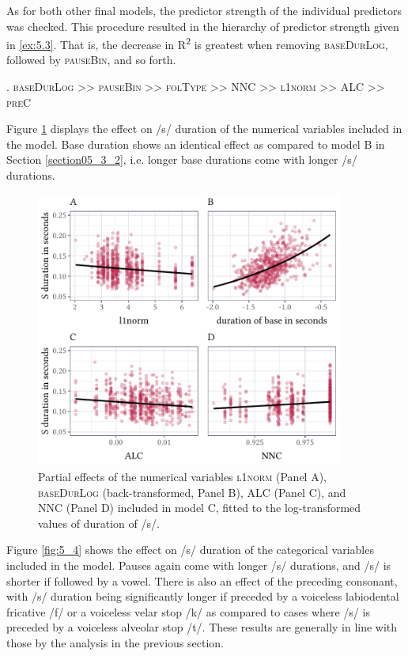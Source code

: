 As for both other final models, the predictor strength of the individual predictors was checked. This procedure resulted in the hierarchy of predictor strength given in \ref{ex:5.3}. That is, the decrease in R\textsuperscript{2} is greatest when removing \textsc{baseDurLog}, followed by \textsc{pauseBin}, and so forth. 

\ex.
\label{ex:5.3}
\textsc{baseDurLog >> pauseBin >> folType >> NNC >> l1norm >> ALC >> preC}

Figure \ref{fig:5_3} displays the effect on /s/ duration of the numerical variables included in the model. Base duration shows an identical effect as compared to model B in Section \ref{section05_3_2}, i.e. longer base durations come with longer /s/ durations. 

\begin{figure}
    \centering
    \includegraphics[width=0.9\textwidth]{figures/fig5.3.pdf}
    \caption{Partial effects of the numerical variables \textsc{l1norm} (Panel A), \textsc{baseDurLog} (back-transformed, Panel B), \textsc{ALC} (Panel C), and \textsc{NNC} (Panel D) included in model C, fitted to the log-transformed values of duration of /s/.}
    \label{fig:5_3}
\end{figure}

Figure \ref{fig:5_4} shows the effect on /s/ duration of the categorical variables included in the model. Pauses again come with longer /s/ durations, and /s/ is shorter if followed by a vowel. There is also an effect of the preceding consonant, with /s/ duration being significantly longer if preceded by a voiceless labiodental fricative /f/ or a voiceless velar stop /k/ as compared to cases where /s/ is preceded by a voiceless alveolar stop /t/. These results are generally in line with those by the analysis in the previous section.

